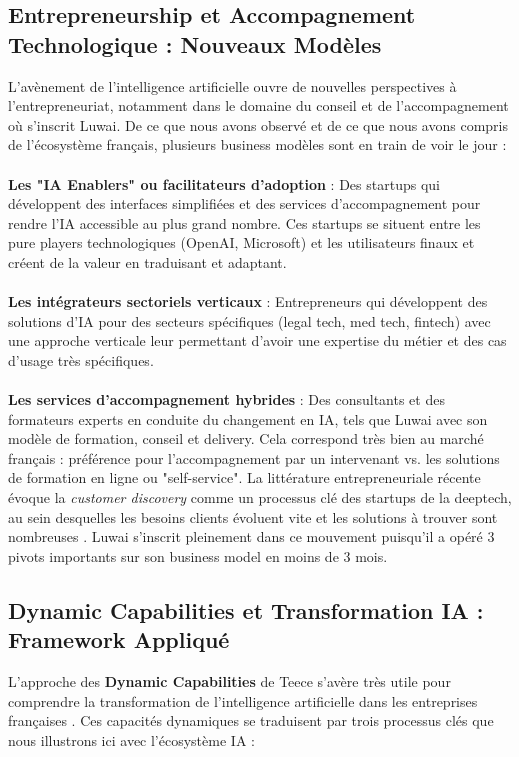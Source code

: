 \subsection{Entrepreneurship et Accompagnement Technologique : Nouveaux Modèles}

L’avènement de l’intelligence artificielle ouvre de nouvelles perspectives à l’entrepreneuriat, notamment dans le domaine du conseil et de l’accompagnement où s’inscrit Luwai. De ce que nous avons observé et de ce que nous avons compris de l’écosystème français, plusieurs business modèles sont en train de voir le jour :
\\\\
\textbf{Les "IA Enablers" ou facilitateurs d'adoption} : Des startups qui développent des interfaces simplifiées et des services d'accompagnement pour rendre l'IA accessible au plus grand nombre. Ces startups se situent entre les pure players technologiques (OpenAI, Microsoft) et les utilisateurs finaux et créent de la valeur en traduisant et adaptant\cite{parker2016platform}.
\\\\
\textbf{Les intégrateurs sectoriels verticaux} : Entrepreneurs qui développent des solutions d'IA pour des secteurs spécifiques (legal tech, med tech, fintech) avec une approche verticale leur permettant d'avoir une expertise du métier et des cas d'usage très spécifiques.
\\\\
\textbf{Les services d'accompagnement hybrides} : Des consultants et des formateurs experts en conduite du changement en IA, tels que Luwai avec son modèle de formation, conseil et delivery.
Cela correspond très bien au marché français : préférence pour l'accompagnement par un intervenant vs. les solutions de formation en ligne ou "self-service".
La littérature entrepreneuriale récente évoque la \textit{customer discovery} comme un processus clé des startups de la deeptech, au sein desquelles les besoins clients évoluent vite et les solutions à trouver sont nombreuses \cite{blank2013lean, osterwalder2014value}.  
Luwai s’inscrit pleinement dans ce mouvement puisqu’il a opéré 3 pivots importants sur son business model en moins de 3 mois.

\subsection{Dynamic Capabilities et Transformation IA : Framework Appliqué}

L’approche des \textbf{Dynamic Capabilities} de Teece s’avère très utile pour comprendre la transformation de l’intelligence artificielle dans les entreprises françaises \cite{teece2007dynamic}.  Ces capacités dynamiques se traduisent par trois processus clés que nous illustrons ici avec l’écosystème IA :


